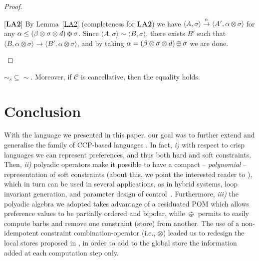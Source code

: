 \documentclass{llncs}
\def\odiv{\, {\ominus\hspace{-7.7pt} \div} \,}
\begin{document}
\begin{proof}
\begin{description}
		\item{[{\bf LA2}]}
		By Lemma~\ref{LA2} (completeness for {\bf LA2}) we have $\langle A,  \sigma \rangle  \xrightarrow{\alpha}\langle A', \alpha \otimes \sigma \rangle$
		for any $\alpha \leq (\beta \otimes \sigma \otimes d) \odiv \sigma$.
		Since $\langle A,\sigma \rangle \sim \langle B,\sigma \rangle$, 
		there exists $B'$ such that 
		$\langle B, \alpha \otimes \sigma \rangle \xrightarrow{} \langle B', \alpha \otimes \sigma \rangle$,
		and by taking $\alpha = (\beta \otimes \sigma \otimes d) \odiv \sigma$ we are done.
	\end{description}
\end{proof}


%
\begin{theorem}
$\sim_{\mathit{s}} \subseteq \sim$. Moreover, if $\mathcal{C}$ is cancellative, then the equality holds.
\end{theorem}



\section{Conclusion}\label{sec:conclusion}
With the language we presented in this paper, our goal was to further extend and generalise  the family of CCP-based languages . In fact, \emph{i)}  with respect to crisp languages we can  represent preferences, and thus both hard and soft constraints. Then, \emph{ii)} polyadic operators make it possible  to have a compact – \emph{polynomial} – representation of soft constraints (about this, we point the interested reader to \cite{festcatuscia}), which in turn can be used in several applications, as in hybrid systems, loop invariant generation, and parameter design of control~\cite{smtpolynomial}.  Furthermore, \emph{iii)} the polyadic algebra we adopted takes advantage of a residuated POM which allows preference values to be partially ordered and bipolar, while $\odiv$ permits to easily compute barbs and remove one constraint (store) from another. The use of a non-idempotent constraint combination-operator (i.e., $\otimes$) leaded us to redesign the local stores proposed in \cite{pippo}, in order to add to the global store the information added at each computation step only.
\end{document}
